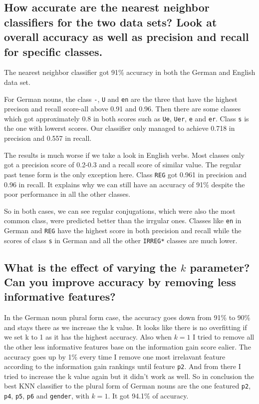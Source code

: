 \documentclass[11pt]{article} %
\begin{document}
\subsection{How accurate are the nearest neighbor classifiers for the two data sets? Look at overall accuracy as well as precision and recall for specific classes.}

The nearest neighbor classifier got 91\% accuracy in both the German and English data set.

For German nouns, the class \verb|-|, \verb|U| and \verb|en| are the three that have the highest precison and recall score-all above 0.91 and 0.96. Then there are some classes which got approximately 0.8 in both scores such as \verb|Ue|, \verb|Uer|, \verb|e| and \verb|er|. Class \verb|s| is the one with lowerst scores. Our classifier only managed to achieve 0.718 in precision and 0.557 in recall.

The results is much worse if we take a look in English verbs. Most classes only got a precision score of 0.2-0.3 and a recall score of similar value. The regular past tense form is the only exception here. Class \verb|REG| got 0.961 in precision and 0.96 in recall. It explains why we can still have an accuracy of 91\% despite the poor performance in all the other classes.

So in both cases, we can see regular conjugations, which were also the most common class, were predicted better than the irrgular ones. Classes like \verb|en| in German and \verb|REG| have the highest score in both precision and recall while the scores of class \verb|s| in German and all the other \verb|IRREG*| classes are much lower.

\subsection{What is the effect of varying the $k$ parameter? Can you improve accuracy by removing less informative features?}

In the German noun plural form case, the accuracy goes down from 91\% to 90\% and stays there as we increase the k value. It looks like there is no overfitting if we set k to 1 as it has the highest accuracy. Also when $k=1$ I tried to remove all the other less informative features base on the information gain score ealier. The accuracy goes up by 1\% every time I remove one most irrelavant feature according to the information gain rankings until feature \verb|p2|. And from there I tried to increase the k value again but it didn't work as well. So in conclusion the best KNN classifier to the plural form of German nouns are the one featured \verb|p2|, \verb|p4|, \verb|p5|, \verb|p6| and \verb|gender|, with $k=1$. It got 94.1\% of accuracy.
\end{document}
